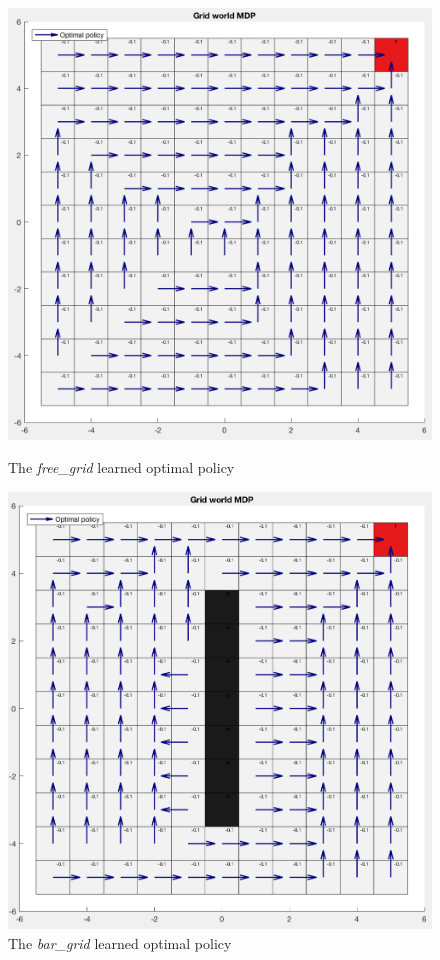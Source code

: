 \documentclass[a4paper]{report}
\begin{document}
{{{				\begin{figure}[ht!]
				\begin{minipage}{0.4\linewidth}
					\includegraphics[width=\linewidth]{free_grid_bellman_policy}
					\caption{The \emph{free\_grid} learned optimal policy}
				\end{minipage}
				\hfill
				\begin{minipage}{0.4\linewidth}
					\includegraphics[width=\linewidth]{bar_grid_bellman_policy}
					\caption{The \emph{bar\_grid} learned optimal policy}
				\end{minipage}
				\end{figure}
				
}}}
\end{document}
